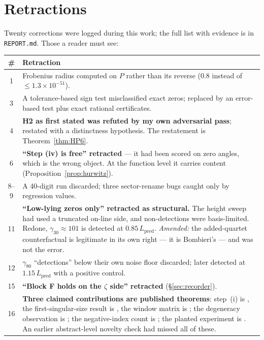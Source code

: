 \documentclass[11pt,a4paper]{article}
\theoremstyle{definition}
\theoremstyle{remark}
\begin{document}
\appendix
\section{Retractions}\label{app:retr}

Twenty corrections were logged during this work; the full list with evidence is in
\texttt{REPORT.md}. Those a reader must see:

\begin{center}
\begin{longtable}{@{}cp{}@{}}
\toprule
\# & Retraction \\
\midrule
\endhead
1 & Frobenius radius computed on $P$ rather than its reverse ($0.8$ instead of
$\le1.3\times10^{-51}$). \\
3 & A tolerance-based sign test misclassified exact zeros; replaced by an error-based test
plus exact rational certificates. \\
4 & \textbf{H2 as first stated was refuted by my own adversarial pass}; restated with a
distinctness hypothesis. The restatement is Theorem~\ref{thm:HP6}. \\
6 & \textbf{``Step (iv) is free'' retracted} --- it had been scored on zero angles, which is
the wrong object. At the function level it carries content
(Proposition~\ref{prop:hurwitz}). \\
8--9 & A 40-digit run discarded; three sector-rename bugs caught only by regression values. \\
11 & \textbf{``Low-lying zeros only'' retracted as structural.} The height sweep had used a
truncated on-line side, and non-detections were basis-limited. Redone,
$\gamma_{30}\approx101$ is detected at $0.85\,L_{\mathrm{pred}}$. \emph{Amended:} the
added-quartet counterfactual is legitimate in its own right --- it is Bombieri's --- and was
not the error. \\
12 & $\gamma_{80}$ ``detections'' below their own noise floor discarded; later detected at
$1.15\,L_{\mathrm{pred}}$ with a positive control. \\
15 & \textbf{``Block F holds on the $\zeta$ side'' retracted} (\S\ref{sec:recorder}). \\
16 & \textbf{Three claimed contributions are published theorems}: step~(i) is
\cite[Thm.~36(ii)]{HP19}, the first-singular-size result is \cite[Thm.~6]{HP19}, the window
matrix is \cite[Prop.~5]{HP19}; the degeneracy observation is \cite[Rem.~2.3]{CvS}; the
negative-index count is \cite[Thm.~8]{Bombieri}; the planted experiment is
\cite[\S13]{Bombieri}. An earlier abstract-level novelty check had missed all of these. \\

\end{longtable}
\end{center}
\end{document}
